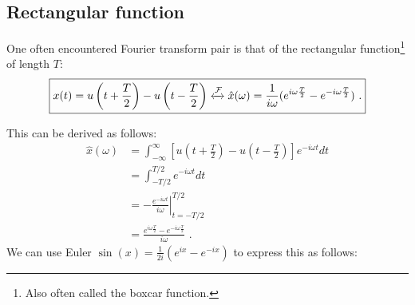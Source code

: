 \subsection{Rectangular function}
One often encountered Fourier transform pair is that of the rectangular 
function\footnote{Also often called the boxcar function.} of length $T$:
\begin{equation}
    \boxed{
        x(t)=u\left(t+\frac{T}{2}\right) - u\left(t-\frac{T}{2}\right) \xleftrightarrow{\mathcal{F}} \hat{x}(\omega) = \frac{1}{i\omega}(e^{i\omega \frac{T}{2}} - e^{-i\omega \frac{T}{2}})\,\,.
    }
\end{equation}

This can be derived as follows:
\begin{align}
    \hat{x}(\omega) & = \int_{-\infty}^{\infty} \left[u\left(t+\frac{T}{2}\right) - u\left(t-\frac{T}{2}\right)\right] e^{-i\omega t}dt \\
                    & = \int_{-T/2}^{T/2} e^{-i\omega t}dt                                                                              \\
                    & =  \left.-\frac{e^{-i\omega t}}{i\omega} \right|_{t=-T/2}^{T/2}                                                   \\
                    & = \frac{e^{i\omega \frac{T}{2}}- e^{-i\omega \frac{T}{2}}}{i\omega}\,\,.
\end{align}
We can use Euler $\sin(x) = \frac{1}{2i} (e^{i x} - e^{-ix})$ to express this as follows:

